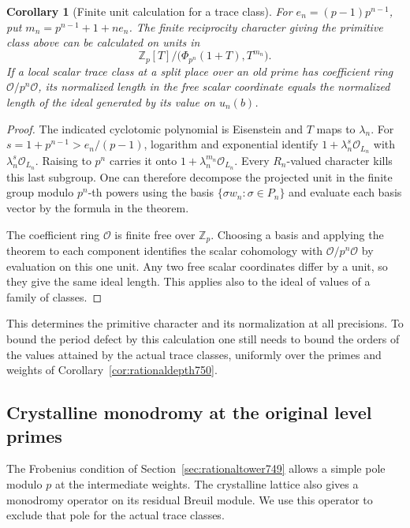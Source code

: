 \documentclass[a4paper,11pt]{article}
\newtheorem{corollary}[proposition]{Corollary}
\theoremstyle{definition}
\theoremstyle{remark}
\newcommand{\ZZ}{\mathbb Z}\newcommand{\ord}{\operatorname{ord}}
\numberwithin{equation}{section}
\begin{document}
\begin{corollary}[Finite unit calculation for a trace class]
\leavevmode\label{cor:finiteunits751}
For \(e_n=(p-1)p^{n-1}\), put \(m_n=p^{n-1}+1+n e_n\).
The finite reciprocity character giving the primitive class
above can be calculated on units in
\[
 \ZZ_p[T]\big/\big(\Phi_{p^n}(1+T),T^{m_n}\big).
\]
If a local scalar trace class at a split place over an old prime
has coefficient ring \(\mathcal O/p^n\mathcal O\), its normalized
length in the free scalar coordinate equals the normalized length
of the ideal generated by its value on \(u_n(b)\).
\end{corollary}
\begin{proof}
The indicated cyclotomic polynomial is Eisenstein and \(T\) maps
to \(\lambda_n\). For \(s=1+p^{n-1}>e_n/(p-1)\), logarithm and
exponential identify \(1+\lambda_n^s\mathcal O_{L_n}\) with
\(\lambda_n^s\mathcal O_{L_n}\). Raising to \(p^n\) carries it
onto \(1+\lambda_n^{m_n}\mathcal O_{L_n}\). Every \(R_n\)-valued
character kills this last subgroup. One can therefore decompose
the projected unit in the finite group modulo \(p^n\)-th powers
using the basis \(\{\sigma w_n:\sigma\in P_n\}\) and evaluate
each basis vector by the formula in the theorem.

The coefficient ring \(\mathcal O\) is finite free over \(\ZZ_p\).
Choosing a basis and applying the theorem to each component
identifies the scalar cohomology with \(\mathcal O/p^n\mathcal O\)
by evaluation on this one unit. Any two free scalar coordinates
differ by a unit, so they give the same ideal length. This
applies also to the ideal of values of a family of classes.
\end{proof}
This determines the primitive character and its normalization at
all precisions. To bound the period defect by this calculation
one still needs to bound the orders of the values attained by
the actual trace classes, uniformly over the primes and weights
of Corollary~\ref{cor:rationaldepth750}.
\clearpage

\subsection{Crystalline monodromy at the original level primes}
\label{sec:oldmonodromy752}
The Frobenius condition of Section~\ref{sec:rationaltower749}
allows a simple pole modulo \(p\) at the intermediate weights.
The crystalline lattice also gives a monodromy operator on its
residual Breuil module. We use this operator to exclude that pole
for the actual trace classes.
\end{document}
